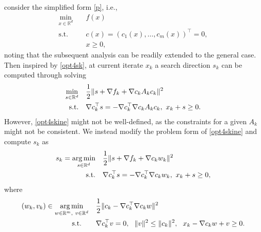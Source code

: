 \documentclass[11pt]{article}
\newcommand{\R}{\mathbb{R}}
\newcommand{\argmin}{\mathop{\mathrm{arg\,min}}}
\newcommand{\be}{\begin{equation}}
\newcommand{\ee}{\end{equation}}
\begin{document}
consider the {simplified form} \eqref{p}, i.e.,
\be\label{p3}
\begin{aligned}
\min_{x\in\R^d} &\quad f(x) \\
\mbox{s.t.}  &\quad c(x)=(c_1(x),\ldots, c_m(x))^\top=0,\\
&\quad x \geq 0,
\end{aligned}
\ee
{noting that the subsequent analysis can be readily extended to the general case.}
Then inspired by \eqref{opt4sk}, at current iterate $x_k$ a  {search} direction \(s_k\) can be computed through solving
\be\begin{aligned}\label{opt4skine}
\min_{s\in\R^d} &\quad \frac{1}{2}\|s+\nabla f_k + \nabla c_k A_k c_k\|^2 \\
~{\rm s.t.}&\quad \nabla c_k^\top s  = - \nabla c_k^\top \nabla c_k A_k c_k,~
x_k + s \geq 0.
\end{aligned}\ee
However, \eqref{opt4skine} might not be well-defined, as the constraints for a given \( A_k \) might not be consistent. 
We instead modify the problem form of \eqref{opt4skine} and compute $s_k$ as 
\be\begin{aligned}\label{opt4skine-w}
s_k = \argmin_{s\in\R^d} &\quad \frac{1}{2}\|s+\nabla f_k + \nabla c_k w_k\|^2 \\
~{\rm s.t.}&\quad \nabla c_k^\top s  = -\nabla c_k^\top \nabla c_k w_k,~
x_k + s \geq 0,
\end{aligned}\ee
where 
\be\begin{aligned}\label{opt4wu}
(w_k,v_k) \in \argmin_{w \in \R^m,~v \in \R^d} &\quad \frac{1}{2}\|c_k -\nabla c_k^\top \nabla c_k w\|^2 \\
~{\rm s.t.}~~~&\quad \nabla c_k^\top v = 0,~~\|v\|^2 \leq \|c_k\|^2,~~
x_k - \nabla c_k w + v \geq 0.
\end{aligned}\ee
\end{document}
